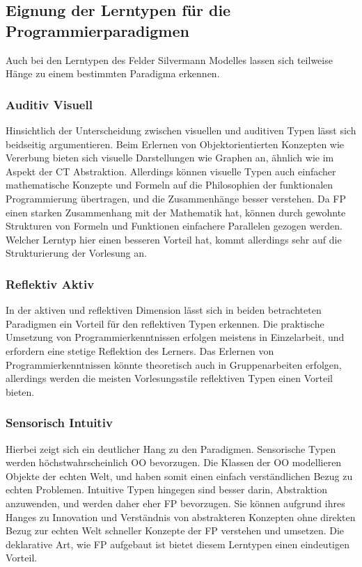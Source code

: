 \subsection{Eignung der Lerntypen für die Programmierparadigmen}
Auch bei den Lerntypen des Felder Silvermann Modelles lassen sich teilweise Hänge zu einem bestimmten Paradigma erkennen.

\subsubsection{Auditiv Visuell}
Hinsichtlich der Unterscheidung zwischen visuellen und auditiven Typen lässt sich beidseitig argumentieren. Beim Erlernen von Objektorientierten Konzepten wie Vererbung bieten sich visuelle Darstellungen wie Graphen an, ähnlich wie im Aspekt der CT Abstraktion.
Allerdings können visuelle Typen auch einfacher mathematische Konzepte und Formeln auf die Philosophien der funktionalen Programmierung übertragen, und die Zusammenhänge besser verstehen. Da FP einen starken Zusammenhang mit der Mathematik hat, können durch gewohnte Strukturen von Formeln und Funktionen einfachere Parallelen gezogen werden.
Welcher Lerntyp hier einen besseren Vorteil hat, kommt allerdings sehr auf die Strukturierung der Vorlesung an.

\subsubsection{Reflektiv Aktiv}
In der aktiven und reflektiven Dimension lässt sich in beiden betrachteten Paradigmen ein Vorteil für den reflektiven Typen erkennen. Die praktische Umsetzung von Programmierkenntnissen erfolgen meistens in Einzelarbeit, und erfordern eine stetige Reflektion des Lerners.
Das Erlernen von Programmierkenntnissen könnte theoretisch auch in Gruppenarbeiten erfolgen, allerdings werden die meisten Vorlesungsstile reflektiven Typen einen Vorteil bieten.

\subsubsection{Sensorisch Intuitiv}
Hierbei zeigt sich ein deutlicher Hang zu den Paradigmen. Sensorische Typen werden höchstwahrscheinlich OO bevorzugen. Die Klassen der OO modellieren Objekte der echten Welt, und haben somit einen einfach verständlichen Bezug zu echten Problemen.
Intuitive Typen hingegen sind besser darin, Abstraktion anzuwenden, und werden daher eher FP bevorzugen. Sie können aufgrund ihres Hanges zu Innovation und Verständnis von abstrakteren Konzepten ohne direkten Bezug zur echten Welt schneller Konzepte der FP verstehen und umsetzen. Die deklarative Art, wie FP aufgebaut ist bietet diesem Lerntypen einen eindeutigen Vorteil.

